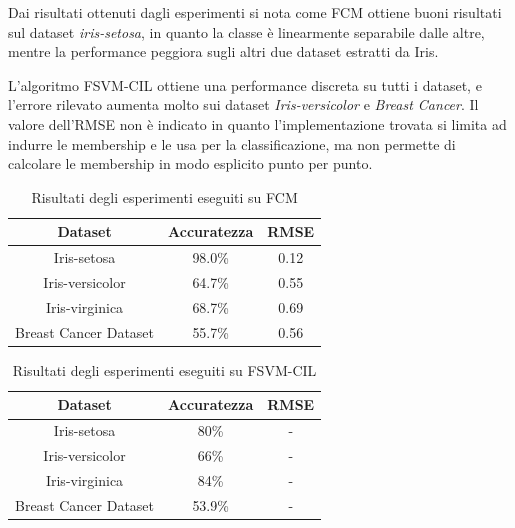 \documentclass[oneside, openany]{book}
\begin{document}
		Dai risultati ottenuti dagli esperimenti si nota come FCM ottiene buoni risultati sul dataset \textit{iris-setosa}, in quanto la classe è linearmente separabile dalle altre, mentre la performance peggiora sugli altri due dataset estratti da Iris.
		
		L'algoritmo FSVM-CIL ottiene una performance discreta su tutti i dataset, e l'errore rilevato aumenta molto sui dataset \textit{Iris-versicolor} e \textit{Breast Cancer}. Il valore dell'RMSE non è indicato in quanto l'implementazione trovata si limita ad indurre le membership e le usa per la classificazione, ma non permette di calcolare le membership in modo esplicito punto per punto.
		
		\begin{table}[h]
		\caption{Risultati degli esperimenti eseguiti su FCM}
		\begin{center}\begin{tabular}{ |c|c|c| } 
				\hline
				\textbf{Dataset} & \textbf{Accuratezza} & \textbf{RMSE}\\
				\hline
				Iris-setosa & 98.0\% & 0.12\\
				\hline
				Iris-versicolor & 64.7\% & 0.55\\
				\hline
				Iris-virginica & 68.7\% & 0.69\\
				\hline
				Breast Cancer Dataset &  55.7\% & 0.56\\
				\hline									
			\end{tabular}
		\end{center}
		\label{tab:fcm}	
		\end{table}
		\begin{table}[h]
			\caption{Risultati degli esperimenti eseguiti su FSVM-CIL}
			\begin{center}\begin{tabular}{ |c|c|c| } 
				\hline
				\textbf{Dataset} & \textbf{Accuratezza} & \textbf{RMSE}\\
				\hline
				Iris-setosa & 80\% & -\\
				\hline
				Iris-versicolor & 66\% & -\\
				\hline
				Iris-virginica & 84\% & -\\
				\hline
				Breast Cancer Dataset &  53.9\% & -\\
				\hline									
			\end{tabular}
		\end{center}
		\label{tab:fsvm}	
		\end{table}
\end{document}
